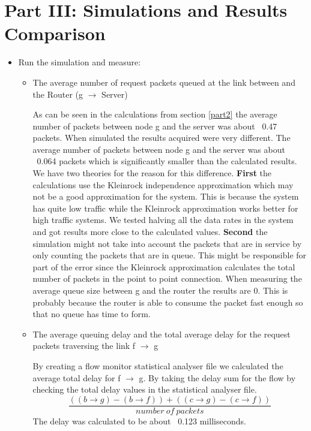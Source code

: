 \documentclass{article}
\begin{document}
\section{Part III: Simulations and Results Comparison} \label{part3}

\begin{itemize}
    \item Run the simulation and measure:
    \begin{itemize}
        \item The average number of request packets queued at the link between and the Router (g $\rightarrow$ Server)
        \begin{addmargin}[1em]{2em}
        As can be seen in the calculations from section \ref{part2} the average number of packets between node g and the server was about ~0.47 packets.
        When simulated the results acquired were very different.
        The average number of packets between node g and the server was about ~0.064 packets which is significantly smaller than the calculated results.
        We have two theories for the reason for this difference.
        \textbf{First} the calculations use the Kleinrock independence approximation which may not be a good approximation for the system.
        This is because the system has quite low traffic while the Kleinrock approximation works better for high traffic systems.
        We tested halving all the data rates in the system and got results more close to the calculated values.
        \textbf{Second} the simulation might not take into account the packets that are in service by only counting the packets that are in queue.
        This might be responsible for part of the error since the Kleinrock approximation calculates the total number of packets in the point to point connection.
        When measuring the average queue size between g and the router the results are 0.
        This is probably because the router is able to consume the packet fast enough so that no queue has time to form.
        \end{addmargin}
        
        \item The average queuing delay and the total average delay for the request packets traversing the link f $\rightarrow$ g
        \begin{addmargin}[1em]{2em}
        By creating a flow monitor statistical analyser file we calculated the average total delay for f $\rightarrow$ g.
        By taking the delay sum for the flow by checking the total delay values in the statistical analyser file.
        $$\frac{((b \rightarrow g) - (b \rightarrow f)) + ((c \rightarrow g) - (c \rightarrow f))}{number\ of\ packets}$$
        The delay was calculated to be about ~0.123 milliseconds.
        

\end{addmargin}
\end{itemize}
\end{itemize}
\end{document}
